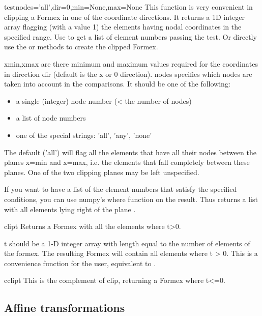 {{\begin{methoddesc}{test}{nodes='all',dir=0,min=None,max=None}
This function is very convenient in clipping a Formex in one of
the coordinate directions. It returns a 1D integer array flagging
(with a value 1) the elements having nodal coordinates in the
specified range.
Use  to get a list of element numbers passing the test.
Or directly use the  or  methods to create the clipped Formex.

xmin,xmax are there minimum and maximum values required for the
coordinates in direction dir (default is the x or 0 direction).
nodes specifies which nodes are taken into account in the comparisons.
It should be one of the following:
\begin{itemize}
\item a single (integer) node number (< the number of nodes)
\item a list of node numbers
\item one of the special strings: 'all', 'any', 'none'
\end{itemize}
The default ('all') will flag all the elements that have all their
nodes between the planes x=min and x=max, i.e. the elements that
fall completely between these planes. One of the two clipping planes
may be left unspecified.
\end{methoddesc}

If you want to have a list of the element numbers that satisfy the specified conditions, you can use numpy's where function on the result. Thus  returns a list with all elements lying right of the plane .

\begin{methoddesc}{clip}{t}
Returns a Formex with all the elements where t>0.

t should be a 1-D integer array with length equal to the number
of elements of the formex.
The resulting Formex will contain all elements where t > 0.
This is a convenience function for the user, equivalent to
.
\end{methoddesc}

\begin{methoddesc}{cclip}{t}
This is the complement of clip, returning a Formex where t<=0.
\end{methoddesc}



\subsection{Affine transformations}

}}
